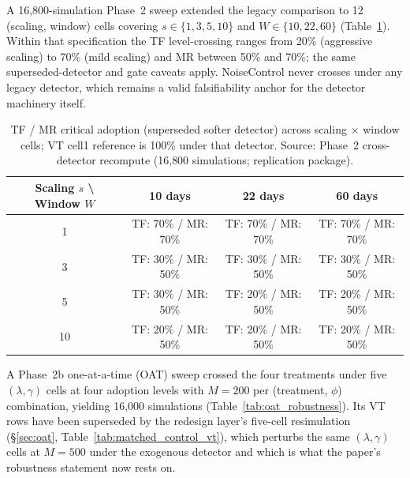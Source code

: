 \documentclass[12pt,a4paper]{article}
\begin{document}
A 16{,}800-simulation Phase~2 sweep extended the legacy comparison to 12 (scaling, window) cells covering $s \in \{1, 3, 5, 10\}$ and $W \in \{10, 22, 60\}$ (Table~\ref{tab:scaling_window_matrix}). Within that specification the TF level-crossing ranges from 20\% (aggressive scaling) to 70\% (mild scaling) and MR between 50\% and 70\%; the same superseded-detector and gate caveats apply. NoiseControl never crosses under any legacy detector, which remains a valid falsifiability anchor for the detector machinery itself.

\begin{table}[H]
\centering
\caption{TF / MR critical adoption (superseded softer detector) across scaling $\times$ window cells; VT cell1 reference is 100\% under that detector. Source: Phase~2 cross-detector recompute (16{,}800 simulations; replication package).}
\label{tab:scaling_window_matrix}
\begin{tabular}{cccc}
\toprule
Scaling $s$ \textbackslash{} Window $W$ & 10 days & 22 days & 60 days \\
\midrule
1  & TF: 70\% / MR: 70\% & TF: 70\% / MR: 70\% & TF: 70\% / MR: 70\% \\
3  & TF: 30\% / MR: 50\% & TF: 30\% / MR: 50\% & TF: 30\% / MR: 50\% \\
5  & TF: 30\% / MR: 50\% & TF: 20\% / MR: 50\% & TF: 20\% / MR: 50\% \\
10 & TF: 20\% / MR: 50\% & TF: 20\% / MR: 50\% & TF: 20\% / MR: 50\% \\
\bottomrule
\end{tabular}
\end{table}

A Phase~2b one-at-a-time (OAT) sweep crossed the four treatments under five $(\lambda, \gamma)$ cells at four adoption levels with $M = 200$ per (treatment, $\phi$) combination, yielding 16{,}000 simulations (Table~\ref{tab:oat_robustness}). Its VT rows have been superseded by the redesign layer's five-cell resimulation (\S\ref{sec:oat}, Table~\ref{tab:matched_control_vt}), which perturbs the same $(\lambda, \gamma)$ cells at $M = 500$ under the exogenous detector and which is what the paper's robustness statement now rests on.
\end{document}
